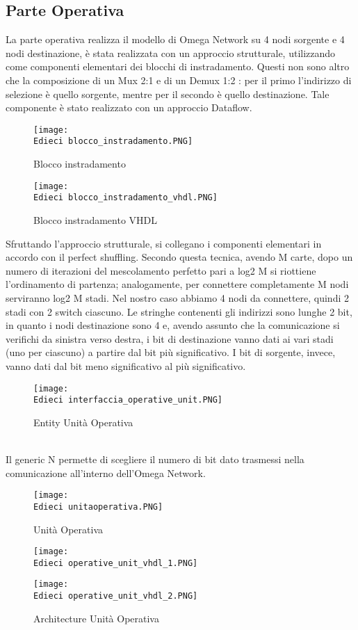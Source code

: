 \documentclass[12pt]{article}
\def \Edieci {Allegati/Esercizio10/}
\begin{document}
\subsection{Parte Operativa}
La parte operativa realizza il modello di Omega Network su 4 nodi sorgente e 4 nodi destinazione, è stata realizzata con un approccio strutturale, utilizzando come componenti elementari dei blocchi di instradamento. Questi non sono altro che la composizione di un Mux 2:1 e di un Demux 1:2 : per il primo l’indirizzo di selezione è quello sorgente, mentre per il secondo è quello destinazione. Tale componente è stato realizzato con un approccio Dataflow.
\begin{figure}[ht!]
    \centering
    \texttt{[image: \\Edieci blocco\_instradamento.PNG]}
    \caption{Blocco instradamento}
\end{figure}
\begin{figure}[ht!]
    \centering
    \texttt{[image: \\Edieci blocco\_instradamento\_vhdl.PNG]}
    \caption{Blocco instradamento VHDL}
\end{figure}
\clearpage
Sfruttando l’approccio strutturale, si collegano i componenti elementari in accordo con il perfect shuffling. Secondo questa tecnica, avendo M carte, dopo un numero di iterazioni del mescolamento perfetto pari a log2 M si riottiene l’ordinamento di partenza; analogamente, per connettere completamente M nodi serviranno log2 M stadi. Nel nostro caso abbiamo 4 nodi da connettere, quindi 2 stadi con 2 switch ciascuno. Le stringhe contenenti gli indirizzi sono lunghe 2 bit, in quanto i nodi destinazione sono 4 e, avendo assunto che la comunicazione si verifichi da sinistra verso destra, i bit di destinazione vanno dati ai vari stadi (uno per ciascuno) a partire dal bit più significativo. I bit di sorgente, invece, vanno dati dal bit meno significativo al più significativo.
\begin{figure}[ht!]
    \centering
    \texttt{[image: \\Edieci interfaccia\_operative\_unit.PNG]}
    \caption{Entity Unità Operativa}
\end{figure}
\\Il generic N permette di scegliere il numero di bit dato trasmessi nella comunicazione all’interno dell’Omega Network.
\begin{figure}[ht!]
    \centering
    \texttt{[image: \\Edieci unitaoperativa.PNG]}
    \caption{Unità Operativa}
\end{figure}
\newpage
\begin{figure}[ht!]
    \centering
    \texttt{[image: \\Edieci operative\_unit\_vhdl\_1.PNG]}
\end{figure}
\begin{figure}[ht!]
    \centering
    \texttt{[image: \\Edieci operative\_unit\_vhdl\_2.PNG]}
    \caption{Architecture Unità Operativa}
\end{figure}
\clearpage
\end{document}
